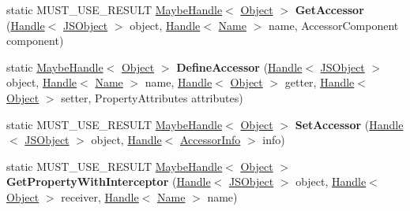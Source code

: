 \begin{DoxyCompactItemize}
\item 
\hypertarget{classv8_1_1internal_1_1_j_s_object_a4218d9d1a4c0a14ef8a15ad781f7113f}{}static M\+U\+S\+T\+\_\+\+U\+S\+E\+\_\+\+R\+E\+S\+U\+L\+T \hyperlink{classv8_1_1internal_1_1_maybe_handle}{Maybe\+Handle}$<$ \hyperlink{classv8_1_1internal_1_1_object}{Object} $>$ {\bfseries Get\+Accessor} (\hyperlink{classv8_1_1internal_1_1_handle}{Handle}$<$ \hyperlink{classv8_1_1internal_1_1_j_s_object}{J\+S\+Object} $>$ object, \hyperlink{classv8_1_1internal_1_1_handle}{Handle}$<$ \hyperlink{classv8_1_1internal_1_1_name}{Name} $>$ name, Accessor\+Component component)\label{classv8_1_1internal_1_1_j_s_object_a4218d9d1a4c0a14ef8a15ad781f7113f}

\item 
\hypertarget{classv8_1_1internal_1_1_j_s_object_ac97d1ed68e9433a947c6a74544c17028}{}static \hyperlink{classv8_1_1internal_1_1_maybe_handle}{Maybe\+Handle}$<$ \hyperlink{classv8_1_1internal_1_1_object}{Object} $>$ {\bfseries Define\+Accessor} (\hyperlink{classv8_1_1internal_1_1_handle}{Handle}$<$ \hyperlink{classv8_1_1internal_1_1_j_s_object}{J\+S\+Object} $>$ object, \hyperlink{classv8_1_1internal_1_1_handle}{Handle}$<$ \hyperlink{classv8_1_1internal_1_1_name}{Name} $>$ name, \hyperlink{classv8_1_1internal_1_1_handle}{Handle}$<$ \hyperlink{classv8_1_1internal_1_1_object}{Object} $>$ getter, \hyperlink{classv8_1_1internal_1_1_handle}{Handle}$<$ \hyperlink{classv8_1_1internal_1_1_object}{Object} $>$ setter, Property\+Attributes attributes)\label{classv8_1_1internal_1_1_j_s_object_ac97d1ed68e9433a947c6a74544c17028}

\item 
\hypertarget{classv8_1_1internal_1_1_j_s_object_a235f7259f408a3c9464e0959bc14480d}{}static M\+U\+S\+T\+\_\+\+U\+S\+E\+\_\+\+R\+E\+S\+U\+L\+T \hyperlink{classv8_1_1internal_1_1_maybe_handle}{Maybe\+Handle}$<$ \hyperlink{classv8_1_1internal_1_1_object}{Object} $>$ {\bfseries Set\+Accessor} (\hyperlink{classv8_1_1internal_1_1_handle}{Handle}$<$ \hyperlink{classv8_1_1internal_1_1_j_s_object}{J\+S\+Object} $>$ object, \hyperlink{classv8_1_1internal_1_1_handle}{Handle}$<$ \hyperlink{classv8_1_1internal_1_1_accessor_info}{Accessor\+Info} $>$ info)\label{classv8_1_1internal_1_1_j_s_object_a235f7259f408a3c9464e0959bc14480d}

\item 
\hypertarget{classv8_1_1internal_1_1_j_s_object_a72bd614db1442016f88400e1ded547bf}{}static M\+U\+S\+T\+\_\+\+U\+S\+E\+\_\+\+R\+E\+S\+U\+L\+T \hyperlink{classv8_1_1internal_1_1_maybe_handle}{Maybe\+Handle}$<$ \hyperlink{classv8_1_1internal_1_1_object}{Object} $>$ {\bfseries Get\+Property\+With\+Interceptor} (\hyperlink{classv8_1_1internal_1_1_handle}{Handle}$<$ \hyperlink{classv8_1_1internal_1_1_j_s_object}{J\+S\+Object} $>$ object, \hyperlink{classv8_1_1internal_1_1_handle}{Handle}$<$ \hyperlink{classv8_1_1internal_1_1_object}{Object} $>$ receiver, \hyperlink{classv8_1_1internal_1_1_handle}{Handle}$<$ \hyperlink{classv8_1_1internal_1_1_name}{Name} $>$ name)\label{classv8_1_1internal_1_1_j_s_object_a72bd614db1442016f88400e1ded547bf}


\end{DoxyCompactItemize}
